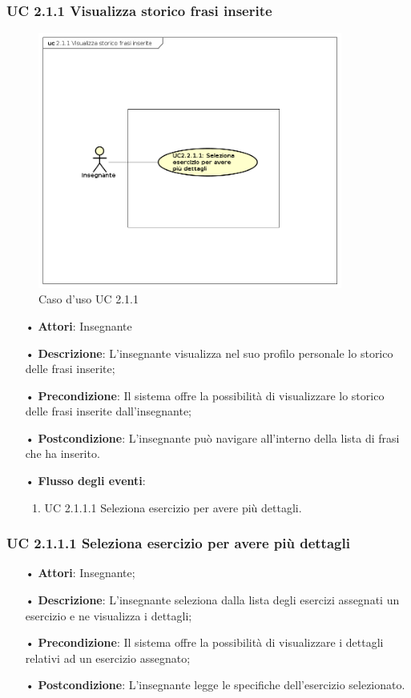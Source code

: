 \subsubsection{UC 2.1.1  Visualizza storico frasi inserite}

\begin{figure}[H]
\centering
\includegraphics[width=10cm]{img/UC211.png} 
\caption{Caso d'uso UC 2.1.1}
\end{figure}

\begin{itemize}
	\item[•] \textbf{Attori}:  Insegnante	\item[•] \textbf{Descrizione}: L’insegnante visualizza nel suo profilo personale lo storico delle frasi inserite; 
	\item[•] \textbf{Precondizione}: Il sistema offre la possibilità di visualizzare lo storico delle frasi inserite dall’insegnante;
	\item[•] \textbf{Postcondizione}:  L’insegnante può navigare all’interno della lista di frasi che ha inserito.
	\item[•] \textbf{Flusso degli eventi}:
		\begin{enumerate}
			\item UC 2.1.1.1  Seleziona esercizio per avere più dettagli.
		\end{enumerate}
\end{itemize}

\subsubsection{UC 2.1.1.1 Seleziona esercizio per avere più dettagli}
\begin{itemize}
	\item[•] \textbf{Attori}: Insegnante;
	\item[•] \textbf{Descrizione}:  L’insegnante seleziona dalla lista degli esercizi assegnati un esercizio e ne visualizza i dettagli;
	\item[•] \textbf{Precondizione}: Il sistema offre la possibilità di visualizzare i dettagli relativi ad un esercizio assegnato;
	\item[•] \textbf{Postcondizione}: L’insegnante legge le specifiche dell’esercizio selezionato.
\end{itemize}

